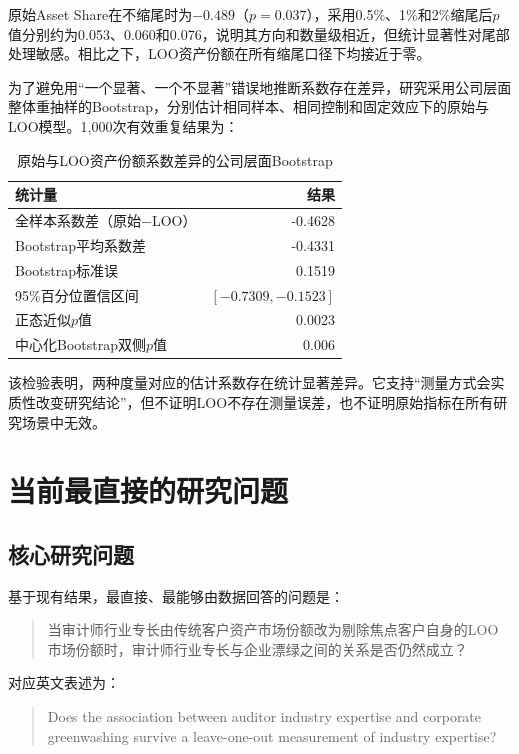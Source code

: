 \documentclass[12pt,a4paper]{article}
\begin{document}
原始Asset Share在不缩尾时为$-0.489$（$p=0.037$），采用0.5\%、1\%和2\%缩尾后$p$值分别约为0.053、0.060和0.076，说明其方向和数量级相近，但统计显著性对尾部处理敏感。相比之下，LOO资产份额在所有缩尾口径下均接近于零。

为了避免用“一个显著、一个不显著”错误地推断系数存在差异，研究采用公司层面整体重抽样的Bootstrap，分别估计相同样本、相同控制和固定效应下的原始与LOO模型。1,000次有效重复结果为：

\begin{table}[htbp]
\centering
\caption{原始与LOO资产份额系数差异的公司层面Bootstrap}
\begin{tabular}{lr}
\toprule
统计量 & 结果 \\
\midrule
全样本系数差（原始$-$LOO） & -0.4628 \\
Bootstrap平均系数差 & -0.4331 \\
Bootstrap标准误 & 0.1519 \\
95\%百分位置信区间 & $[-0.7309,-0.1523]$ \\
正态近似$p$值 & 0.0023 \\
中心化Bootstrap双侧$p$值 & 0.006 \\
\bottomrule
\end{tabular}
\end{table}

该检验表明，两种度量对应的估计系数存在统计显著差异。它支持“测量方式会实质性改变研究结论”，但不证明LOO不存在测量误差，也不证明原始指标在所有研究场景中无效。

\section{当前最直接的研究问题}

\subsection{核心研究问题}

基于现有结果，最直接、最能够由数据回答的问题是：

\begin{quote}
当审计师行业专长由传统客户资产市场份额改为剔除焦点客户自身的LOO市场份额时，审计师行业专长与企业漂绿之间的关系是否仍然成立？
\end{quote}

对应英文表述为：

\begin{quote}
Does the association between auditor industry expertise and corporate greenwashing survive a leave-one-out measurement of industry expertise?
\end{quote}
\end{document}

